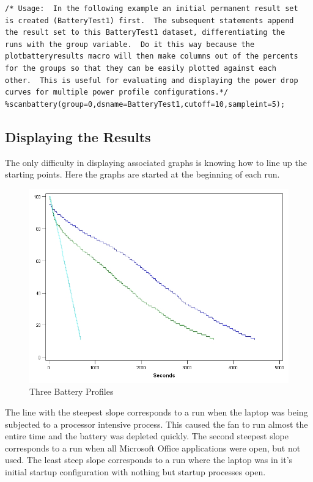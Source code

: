 \documentclass{sugconf}
\begin{document}
\begin{verbatim}
/* Usage:  In the following example an initial permanent result set
is created (BatteryTest1) first.  The subsequent statements append
the result set to this BatteryTest1 dataset, differentiating the
runs with the group variable.  Do it this way because the
plotbatteryresults macro will then make columns out of the percents
for the groups so that they can be easily plotted against each
other.  This is useful for evaluating and displaying the power drop
curves for multiple power profile configurations.*/
%scanbattery(group=0,dsname=BatteryTest1,cutoff=10,sampleint=5);
\end{verbatim}

\subsection{Displaying the Results}

The only difficulty in displaying associated graphs is knowing how
to line up the starting points.  Here the graphs are started at the
beginning of each run.

\begin{figure}[htbp] 
   \centering
   \includegraphics[width=7in]{battery.jpg} 
   \caption{Three Battery Profiles}
   \label{fig:battery}
\end{figure}
The line with the steepest slope corresponds to a run when the laptop was being subjected to a processor intensive process.  This caused the fan to run almost the entire time and the battery was depleted quickly.  The second steepest slope corresponds to a run when all Microsoft Office applications were open, but not used.  The least steep slope corresponds to a run where the laptop was in it's initial startup configuration with nothing but startup processes open.  
\end{document}
